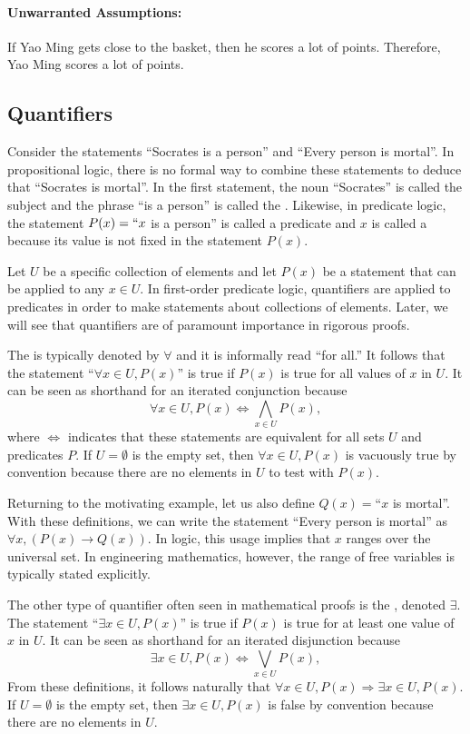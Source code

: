 \paragraph{Unwarranted Assumptions:}
If Yao Ming gets close to the basket, then he scores a lot of points.
Therefore, Yao Ming scores a lot of points.


\subsection{Quantifiers}

Consider the statements ``Socrates is a person'' and ``Every person is mortal''.
In propositional logic, there is no formal way to combine these statements to deduce that ``Socrates is mortal''.
In the first statement, the noun ``Socrates'' is called the subject and the phrase ``is a person'' is called the .
Likewise, in predicate logic, the statement $P(x)=``x$ is a person'' is called a predicate and $x$ is called a  because its value is not fixed in the statement $P(x)$.

Let $U$ be a specific collection of elements and let $P(x)$ be a statement that can be applied to any $x\in U$.
In first-order predicate logic, quantifiers are applied to predicates in order to make statements about collections of elements.
Later, we will see that quantifiers are of paramount importance in rigorous proofs.

The  is typically denoted by $\forall$ and it is informally read ``for all.''
It follows that the statement ``$\forall x \in U, P(x)$'' is true if $P(x)$ is true for all values of $x$ in $U$.
It can be seen as shorthand for an iterated conjunction because
\[ \forall x \in U, P(x) \Leftrightarrow \bigwedge_{x\in U} P(x), \]
where $\Leftrightarrow$ indicates that these statements are equivalent for all sets $U$ and predicates $P$.
If $U=\emptyset$ is the empty set, then $\forall x \in U, P(x)$ is vacuously true by convention because there are no elements in $U$ to test with $P(x)$.

Returning to the motivating example, let us also define $Q(x)=$``$x$ is mortal''.
With these definitions, we can write the statement ``Every person is mortal'' as $\forall x, ( P(x) \to Q(x) )$.
In logic, this usage implies that $x$ ranges over the universal set.
In engineering mathematics, however, the range of free variables is typically stated explicitly.
 
The other type of quantifier often seen in mathematical proofs is the , denoted $\exists$.
The statement ``$\exists x \in U, P(x)$'' is true if $P(x)$ is true for at least one value of $x$ in $U$.
It can be seen as shorthand for an iterated disjunction because
\[ \exists x \in U, P(x) \Leftrightarrow \bigvee_{x\in U} P(x), \]
From these definitions, it follows naturally that $\forall x\in U, P(x) \Rightarrow \exists x\in U, P(x)$.
If $U=\emptyset$ is the empty set, then $\exists x \in U, P(x)$ is false by convention because there are no elements in $U$.


